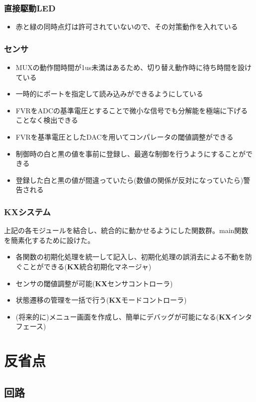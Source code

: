 \documentclass[a4paper]{ltjsarticle}
\newcommand{\kasix}{\textbf{K\hspace{-0.31em}\raisebox{0.17em}{\scalebox{0.7}{A}}\hspace{-0.11em}{S}\hspace{-0.08em}\scalebox{0.8}{i}\hspace{-0.1em}X}}
\begin{document}
\subsubsection{直接駆動LED}
\begin{itemize}
  \item 赤と緑の同時点灯は許可されていない\cite{ds:led}ので、その対策動作を入れている
\end{itemize}
\subsubsection{センサ}
\begin{itemize}
  \item MUXの動作間時間が1us未満はある\cite{ds:mux}ため、切り替え動作時に待ち時間を設けている
  \item 一時的にポートを指定して読み込みができるようにしている
  \item FVRをADCの基準電圧とすることで微小な信号でも分解能を極端に下げることなく検出できる
  \item FVRを基準電圧としたDACを用いてコンパレータの閾値調整ができる
  \item 制御時の白と黒の値を事前に登録し、最適な制御を行うようにすることができる
  \item 登録した白と黒の値が間違っていたら(数値の関係が反対になっていたら)警告される
\end{itemize}
\subsubsection{\kasix システム}
上記の各モジュールを結合し、統合的に動かせるようにした関数群。main関数を簡素化するために設けた。
\begin{itemize}
  \item 各関数の初期化処理を統一して記入し、初期化処理の誤消去による不動を防ぐことができる(\kasix 統合初期化マネージャ)
  \item センサの閾値調整が可能(\kasix センサコントローラ)
  \item 状態遷移の管理を一括で行う(\kasix モードコントローラ)
  \item (将来的に)メニュー画面を作成し、簡単にデバッグが可能になる(\kasix インタフェース)
\end{itemize}



\section{反省点}
\subsection{回路}
\end{document}
